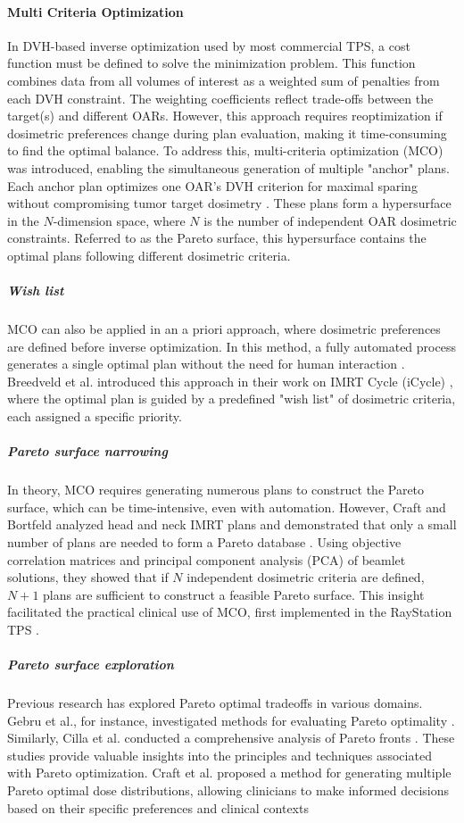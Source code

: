 \paragraph{Multi Criteria Optimization}
In DVH-based inverse optimization used by most commercial TPS, a cost function must be defined to solve the minimization problem.
This function combines data from all volumes of interest as a weighted sum of penalties from each DVH constraint.
The weighting coefficients reflect trade-offs between the target(s) and different OARs.
However, this approach requires reoptimization if dosimetric preferences change during plan evaluation, making it time-consuming to find the optimal balance.
To address this, multi-criteria optimization (MCO) was introduced, enabling the simultaneous generation of multiple "anchor" plans.
Each anchor plan optimizes one OAR’s DVH criterion for maximal sparing without compromising tumor target dosimetry \cite{lahanas2003,thieke2007}.
These plans form a hypersurface in the $N$-dimension space, where $N$ is the number of independent OAR dosimetric constraints.
Referred to as the Pareto surface, this hypersurface contains the optimal plans following different dosimetric criteria.

\subparagraph{Wish list}
MCO can also be applied in an a priori approach, where dosimetric preferences are defined before inverse optimization.
In this method, a fully automated process generates a single optimal plan without the need for human interaction \cite{breedveld2007}.
Breedveld et al. introduced this approach in their work on IMRT Cycle (iCycle) \cite{iCycle}, where the optimal plan is guided by a predefined "wish list" of dosimetric criteria, each assigned a specific priority.

\subparagraph{Pareto surface narrowing}
In theory, MCO requires generating numerous plans to construct the Pareto surface, which can be time-intensive, even with automation.
However, Craft and Bortfeld analyzed head and neck IMRT plans and demonstrated that only a small number of plans are needed to form a Pareto database \cite{craft2008}.
Using objective correlation matrices and principal component analysis (PCA) of beamlet solutions, they showed that if $N$ independent dosimetric criteria are defined, $N + 1$ plans are sufficient to construct a feasible Pareto surface.
This insight facilitated the practical clinical use of MCO, first implemented in the RayStation TPS \cite{RayStationTPS}.

\subparagraph{Pareto surface exploration}
Previous research has explored Pareto optimal tradeoffs in various domains.
Gebru et al., for instance, investigated methods for evaluating Pareto optimality \cite{Gebru2023}.
Similarly, Cilla et al. conducted a comprehensive analysis of Pareto fronts \cite{Cilla2018}.
These studies provide valuable insights into the principles and techniques associated with Pareto optimization.
Craft et al. proposed a method for generating multiple Pareto optimal dose distributions, allowing clinicians to make informed decisions based on their specific preferences and clinical contexts \cite{Craft2007}

